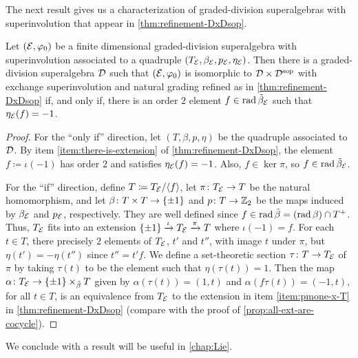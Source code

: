 The next result gives us a characterization of graded-division superalgebras with superinvolution that appear in \cref{thm:refinement-DxDsop}. 

\begin{prop}\label{lemma:undoubling-D}
    Let $(\mathcal E, \varphi_0)$ be a finite dimensional graded-division superalgebra with superinvolution associated to a quadruple $(T_{\mathcal E}, \beta_{\mathcal E}, p_{\mathcal E}, \eta_{\mathcal E})$. 
    Then there is a graded-division superalgebra $\mathcal{D}$ such that $(\mathcal E, \varphi_0)$ is isomorphic to $\mathcal{D} \times \mathcal{D}^{\mathrm{sop}}$ with exchange superinvolution and natural grading refined as in \cref{thm:refinement-DxDsop} if, and only if, there is an order $2$ element $f\in \operatorname{rad} \tilde\beta_{\mathcal E}$ such that $\eta_{\mathcal E}(f) = -1$. 
\end{prop}

\begin{proof}
    For the ``only if'' direction, let $(T, \beta, p, \eta)$ be the quadruple associated to $\mathcal{D}$. 
    By item \eqref{item:there-is-extension} of \cref{thm:refinement-DxDsop}, the element $f \coloneqq \iota(-1)$ has order $2$ and satisfies $\eta_{\mathcal E} (f) = -1$. 
    Also, $f \in \ker \pi$, so $f \in \operatorname{rad} \tilde\beta_{\mathcal E}$.
    
    For the ``if'' direction, define $T \coloneqq T_{\mathcal E} / \langle f \rangle$, let $\pi\colon T_{\mathcal E} \to T$ be the natural homomorphism, and let $\beta\colon T\times T \to \{ \pm 1 \}$ and $p\colon T \to \mathbb{Z}_2$ be the maps induced by $\beta_{\mathcal E}$ and $p_{\mathcal E}$, respectively. 
    They are well defined since $f\in \operatorname{rad} \tilde\beta = (\operatorname{rad} \beta) \cap T^+$. 
    Thus, $T_{\mathcal E}$ fits into an extension $\{ \pm 1 \} \xrightarrow{\iota}  T_{\mathcal E} \xrightarrow{\pi} T$ where $\iota (-1) = f$. 
    For each $t \in T$, there precisely $2$ elements of $T_{\mathcal E}$, $t'$ and $t''$, with image $t$ under $\pi$, but $\eta(t') = -\eta(t'')$ since $t'' = t'f$. 
    We define a set-theoretic section $\tau\colon T \to T_{\mathcal E}$ of $\pi$ by taking $\tau(t)$ to be the element such that $\eta(\tau(t)) = 1$. 
    Then the map $\alpha\colon T_{\mathcal E} \to \{ \pm 1 \} \times_{\tilde\beta} T$ given by $\alpha(\tau(t)) = (1, t)$ and $\alpha(f\tau(t)) = (-1, t)$, for all $t\in T$, is an equivalence from $T_{\mathcal E}$ to the extension in item \eqref{item:pmone-x-T} in \cref{thm:refinement-DxDsop} (compare with the proof of \cref{prop:all-ext-are-cocycle}). 
\end{proof}

We conclude with a result will be useful in \cref{chap:Lie}. 

